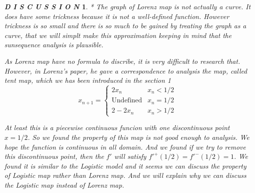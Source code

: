 \documentclass[12pt]{article}
\theoremstyle{plain}
\newtheorem{definition}{\textbf{Definition}}[section]
\newtheorem{discussion}{\textit{D I S C U S S I O N}}[section]
\begin{document}
\begin{discussion}
* The graph of Lorenz map is not actually a curve. It does have some trickness because it is not a well-defined function. However trickness is so small and there is so much to be gained by treating the graph as a curve, that we will simplt make this approximation keeping in mind that the sunsequence analysis is plausible.









As Lorenz map have no formula to discribe, it is very difficult to research that. However, in Lorenz's paper, he gave a correspondence to analysis the map, called tent map, which we has been introduced in the section 1
$$
x_{n+1} = \left\{
\begin{array}{ll}
2x_n                & x_n < {1/2} \\
\text{Undefined}    & x_n = {1/2} \\
2 - 2x_n            & x_n > {1/2}
\end{array}
\right.
$$

At least this is a piecewise continuous funcion with one discontinuous point $x = 1/2$. So we found the property of this map is not good enough to analysis. We hope the function is continuous in all domain. And we found if we try to remove this discontinuous point, then the $f'$ will satisfy $f'^{+}(1/2) = f'^{-}(1/2) = 1$. We found it is similar to the Logistic model and it seems we can discuss the property of Logistic map rather than Lorenz map. And we will explain why we can discuss the Logistic map instead of Lorenz map.


\end{discussion}
\end{document}

